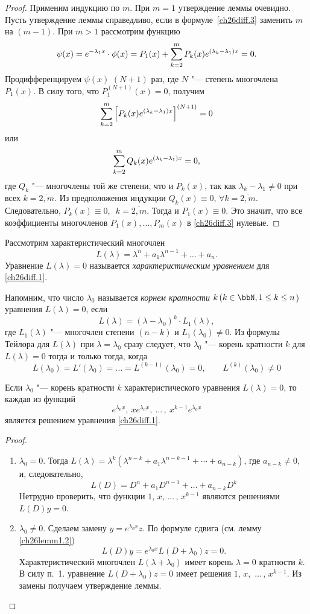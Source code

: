 \begin{proof}
Применим индукцию по $m$. При $m=1$ утверждение леммы очевидно. Пусть утверждение леммы справедливо, если в формуле~\eqref{ch26diff.3} заменить $m$ на $(m-1)$. При $m>1$ рассмотрим функцию
$$
\psi(x)=e^{-\lambda_1x}\cdot\phi(x)=P_1(x)+ \sum_{k=2}^{m}\limits P_k(x)e^{(\lambda_k-\lambda_1)x}=0.
$$
Продифференцируем $\psi(x)$ $(N+1)$ раз, где $N$ "--- степень многочлена $P_1(x)$. В силу того, что $P_1^{(N+1)}(x)=0$, получим 
$$
\sum_{k=2}^{m}\limits\left[P_k(x)e^{(\lambda_k-\lambda_1)x}\right]^{(N+1)}=0
$$
или
$$
\sum_{k=2}^{m}\limits Q_k(x)e^{(\lambda_k-\lambda_1)x}=0,
$$
где $Q_k$ "--- многочлены той же степени, что и $P_k(x)$, так как $\lambda_k-\lambda_1 \neq 0$ при всех $k=\overline{2,m}$. Из предположения индукции $Q_k(x)\equiv 0,\,\forall k=\overline{2,m}$. Следовательно, $P_k(x)\equiv 0,\,$ $k=\overline{2,m}$. Тогда и $P_1(x)\equiv 0$. Это значит, что все коэффициенты многочленов $P_1(x),\dots,P_m(x)$ в \eqref{ch26diff.3} нулевые.
\end{proof}

Рассмотрим характеристический многочлен
$$
L(\lambda)=\lambda^n+a_1\lambda^{n-1}+\dots+a_n.
$$
Уравнение $L(\lambda)=0$ называется \textit{характеристическим уравнением} для \eqref{ch26diff.1}.

Напомним, что число $\lambda_0$ называется \textit{корнем кратности} $k\,(k\in\bbN, 1\le k \le n$) уравнения $L(\lambda)=0$, если
$$
L(\lambda)=(\lambda-\lambda_0)^k\cdot L_1(\lambda),
$$
где $L_1(\lambda)$ "--- многочлен степени $(n-k)$ и $L_1(\lambda_0)\neq 0$. Из формулы Тейлора для $L(\lambda)$ при $\lambda=\lambda_0$ сразу следует, что  $\lambda_0$ "--- корень кратности $k$ для $L(\lambda)=0$ тогда и только тогда, когда
$$
L(\lambda_0)=L'(\lambda_0)=\dots=L^{(k-1)}(\lambda_0)=0, \qquad L^{(k)}(\lambda_0)\neq 0
$$

\begin{lemm} \label{ch26lemm2.3}
Если $\lambda_0$ "--- корень кратности $k$ характеристического уравнения $L(\lambda)=0$, то каждая из функций 
$$
e^{\lambda_0 x},\ xe^{\lambda_0 x},\ \dots\,,\ x^{k-1}e^{\lambda_0 x}
$$
является решением уравнения \eqref{ch26diff.1}.
\end{lemm}

\begin{proof}
\begin{enumerate}[wide, labelwidth=!, labelindent=0pt] 
\item
$\lambda_0=0$. Тогда $L(\lambda)=\lambda^k(\lambda^{n-k}+a_1\lambda^{n-k-1}+\cdots+a_{n-k})$, где  $a_{n-k}\neq 0$, и, следовательно,
$$
L(D)=D^n+a_1D^{n-1}+\dots+a_{n-k}D^k
$$
Нетрудно проверить, что функции $1$, $x$, $\dots\,$, $x^{k-1}$ являются решениями $L(D)y=0$.

\item 
$\lambda_0\neq 0$. Сделаем замену $y=e^{\lambda_0x}z$. По формуле сдвига (см. лемму \ref{ch26lemm1.2})
$$
L(D)y=e^{\lambda_0x}L(D+\lambda_0)z=0.
$$
Характеристический многочлен $L(\lambda+\lambda_0)$ имеет корень $\lambda=0$ кратности $k$. В силу п.~1. уравнение $L(D+\lambda_0)z=0$ имеет решения $1$, $x$,~$\dots\,$, $x^{k-1}$. Из замены получаем утверждение леммы.
\end{enumerate}
\end{proof}


